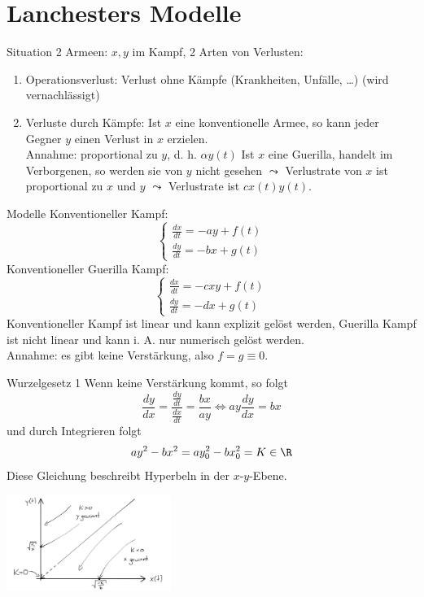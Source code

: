 \section{Lanchesters Modelle}

\begin{karte}{Situation}
    2 Armeen: \(x,y\) im Kampf, 2 Arten von Verlusten: 
    \begin{enumerate}
        \item Operationsverlust: Verlust ohne Kämpfe (Krankheiten, Unfälle, \ldots) (wird vernachlässigt)
        \item Verluste durch Kämpfe: Ist \(x\) eine konventionelle Armee, so kann 
        jeder Gegner \(y\) einen Verlust in \(x\) erzielen.\\
        Annahme: proportional zu \(y\), d. h. \(\alpha y(t)\)
        Ist \(x\) eine Guerilla, handelt im Verborgenen, so werden sie von \(y\) 
        nicht gesehen \(\leadsto\) Verlustrate von \(x\) ist proportional zu \(x\) und \(y\)
        \(\leadsto \) Verlustrate ist \(c x(t) y(t)\).
    \end{enumerate}
\end{karte}

\begin{karte}{Modelle}
    Konventioneller Kampf: 
    \[ \begin{cases}
        \frac{dx}{dt} = -ay + f(t) \\
        \frac{dy}{dt} = -bx + g(t)
    \end{cases} \]
    Konventioneller Guerilla Kampf: 
    \[ \begin{cases}
        \frac{dx}{dt} = -cxy + f(t) \\
        \frac{dy}{dt} = -dx + g(t)
    \end{cases} \]
    Konventioneller Kampf ist linear und kann explizit gelöst werden, 
    Guerilla Kampf ist nicht linear und kann i. A. nur numerisch gelöst werden.\\
    Annahme: es gibt keine Verstärkung, also \(f = g \equiv 0\).
\end{karte}

\begin{karte}{Wurzelgesetz 1}
    Wenn keine Verstärkung kommt, so folgt 
    \[ \frac{dy}{dx} = \frac{\frac{dy}{dt}}{\frac{dx}{dt}} = \frac{bx}{ay} 
    \Leftrightarrow ay \frac{dy}{dx} = bx \]
    und durch Integrieren folgt 
    \[ ay^2 - bx^2 = ay_0^2 - bx_0^2 = K \in \R \]
    Diese Gleichung beschreibt Hyperbeln in der \(x\)-\(y\)-Ebene.
    \begin{center}
        \includegraphics[width=0.4\textwidth]{img/wurzelgesetz.png}
    \end{center}
\end{karte}

